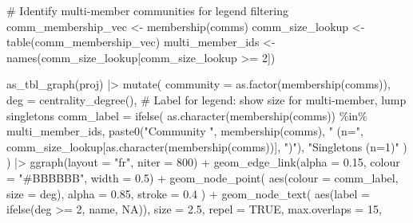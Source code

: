 \documentclass[
  letterpaper,
  DIV=11,
  numbers=noendperiod]{scrartcl}
\newenvironment{Shaded}{\begin{snugshade}}{\end{snugshade}}
\newcommand{\AttributeTok}[1]{\textcolor[rgb]{0.40,0.45,0.13}{#1}}
\newcommand{\CommentTok}[1]{\textcolor[rgb]{0.37,0.37,0.37}{#1}}
\newcommand{\ConstantTok}[1]{\textcolor[rgb]{0.56,0.35,0.01}{#1}}
\newcommand{\DecValTok}[1]{\textcolor[rgb]{0.68,0.00,0.00}{#1}}
\newcommand{\FloatTok}[1]{\textcolor[rgb]{0.68,0.00,0.00}{#1}}
\newcommand{\FunctionTok}[1]{\textcolor[rgb]{0.28,0.35,0.67}{#1}}
\newcommand{\NormalTok}[1]{\textcolor[rgb]{0.00,0.23,0.31}{#1}}
\newcommand{\OtherTok}[1]{\textcolor[rgb]{0.00,0.23,0.31}{#1}}
\newcommand{\SpecialCharTok}[1]{\textcolor[rgb]{0.37,0.37,0.37}{#1}}
\newcommand{\StringTok}[1]{\textcolor[rgb]{0.13,0.47,0.30}{#1}}
\begin{document}
\begin{Shaded}
\begin{Highlighting}[]
\CommentTok{\# Identify multi{-}member communities for legend filtering}
\NormalTok{comm\_membership\_vec }\OtherTok{\textless{}{-}} \FunctionTok{membership}\NormalTok{(comms)}
\NormalTok{comm\_size\_lookup    }\OtherTok{\textless{}{-}} \FunctionTok{table}\NormalTok{(comm\_membership\_vec)}
\NormalTok{multi\_member\_ids    }\OtherTok{\textless{}{-}} \FunctionTok{names}\NormalTok{(comm\_size\_lookup[comm\_size\_lookup }\SpecialCharTok{\textgreater{}=} \DecValTok{2}\NormalTok{])}

\FunctionTok{as\_tbl\_graph}\NormalTok{(proj) }\SpecialCharTok{|\textgreater{}}
  \FunctionTok{mutate}\NormalTok{(}
    \AttributeTok{community  =} \FunctionTok{as.factor}\NormalTok{(}\FunctionTok{membership}\NormalTok{(comms)),}
    \AttributeTok{deg        =} \FunctionTok{centrality\_degree}\NormalTok{(),}
    \CommentTok{\# Label for legend: show size for multi{-}member, lump singletons}
    \AttributeTok{comm\_label =} \FunctionTok{ifelse}\NormalTok{(}
      \FunctionTok{as.character}\NormalTok{(}\FunctionTok{membership}\NormalTok{(comms)) }\SpecialCharTok{\%in\%}\NormalTok{ multi\_member\_ids,}
      \FunctionTok{paste0}\NormalTok{(}\StringTok{"Community "}\NormalTok{, }\FunctionTok{membership}\NormalTok{(comms), }\StringTok{" (n="}\NormalTok{,}
\NormalTok{             comm\_size\_lookup[}\FunctionTok{as.character}\NormalTok{(}\FunctionTok{membership}\NormalTok{(comms))], }\StringTok{")"}\NormalTok{),}
      \StringTok{"Singletons (n=1)"}
\NormalTok{    )}
\NormalTok{  ) }\SpecialCharTok{|\textgreater{}}
  \FunctionTok{ggraph}\NormalTok{(}\AttributeTok{layout =} \StringTok{"fr"}\NormalTok{, }\AttributeTok{niter =} \DecValTok{800}\NormalTok{) }\SpecialCharTok{+}
  \FunctionTok{geom\_edge\_link}\NormalTok{(}\AttributeTok{alpha =} \FloatTok{0.15}\NormalTok{, }\AttributeTok{colour =} \StringTok{"\#BBBBBB"}\NormalTok{, }\AttributeTok{width =} \FloatTok{0.5}\NormalTok{) }\SpecialCharTok{+}
  \FunctionTok{geom\_node\_point}\NormalTok{(}
    \FunctionTok{aes}\NormalTok{(}\AttributeTok{colour =}\NormalTok{ comm\_label, }\AttributeTok{size =}\NormalTok{ deg),}
    \AttributeTok{alpha =} \FloatTok{0.85}\NormalTok{, }\AttributeTok{stroke =} \FloatTok{0.4}
\NormalTok{  ) }\SpecialCharTok{+}
  \FunctionTok{geom\_node\_text}\NormalTok{(}
    \FunctionTok{aes}\NormalTok{(}\AttributeTok{label =} \FunctionTok{ifelse}\NormalTok{(deg }\SpecialCharTok{\textgreater{}=} \DecValTok{2}\NormalTok{, name, }\ConstantTok{NA}\NormalTok{)),}
    \AttributeTok{size =} \FloatTok{2.5}\NormalTok{, }\AttributeTok{repel =} \ConstantTok{TRUE}\NormalTok{, }\AttributeTok{max.overlaps =} \DecValTok{15}\NormalTok{,}

\end{Highlighting}
\end{Shaded}
\end{document}
